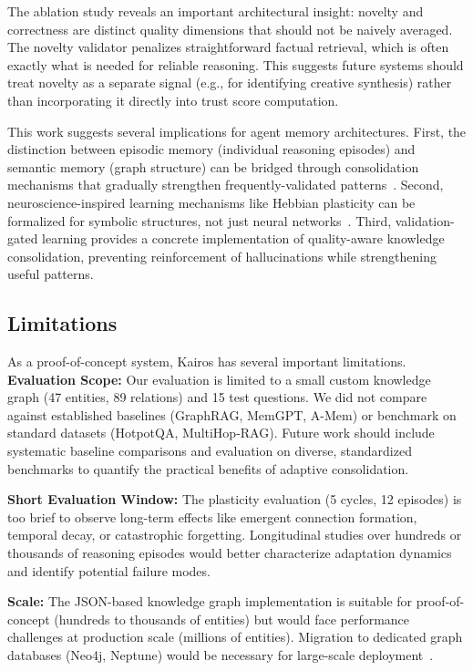 \documentclass{article}
\begin{document}
The ablation study reveals an important architectural insight: novelty and correctness are distinct quality dimensions that should not be naively averaged. The novelty validator penalizes straightforward factual retrieval, which is often exactly what is needed for reliable reasoning. This suggests future systems should treat novelty as a separate signal (e.g., for identifying creative synthesis) rather than incorporating it directly into trust score computation.

This work suggests several implications for agent memory architectures. First, the distinction between episodic memory (individual reasoning episodes) and semantic memory (graph structure) can be bridged through consolidation mechanisms that gradually strengthen frequently-validated patterns~\citep{squire2015memory}. Second, neuroscience-inspired learning mechanisms like Hebbian plasticity can be formalized for symbolic structures, not just neural networks~\citep{mvil2024hebbian}. Third, validation-gated learning provides a concrete implementation of quality-aware knowledge consolidation, preventing reinforcement of hallucinations while strengthening useful patterns.

\subsection{Limitations}

As a proof-of-concept system, Kairos has several important limitations. \textbf{Evaluation Scope:} Our evaluation is limited to a small custom knowledge graph (47 entities, 89 relations) and 15 test questions. We did not compare against established baselines (GraphRAG, MemGPT, A-Mem) or benchmark on standard datasets (HotpotQA, MultiHop-RAG). Future work should include systematic baseline comparisons and evaluation on diverse, standardized benchmarks to quantify the practical benefits of adaptive consolidation.

\textbf{Short Evaluation Window:} The plasticity evaluation (5 cycles, 12 episodes) is too brief to observe long-term effects like emergent connection formation, temporal decay, or catastrophic forgetting. Longitudinal studies over hundreds or thousands of reasoning episodes would better characterize adaptation dynamics and identify potential failure modes.

\textbf{Scale:} The JSON-based knowledge graph implementation is suitable for proof-of-concept (hundreds to thousands of entities) but would face performance challenges at production scale (millions of entities). Migration to dedicated graph databases (Neo4j, Neptune) would be necessary for large-scale deployment~\citep{edge2024graphrag}.
\end{document}
